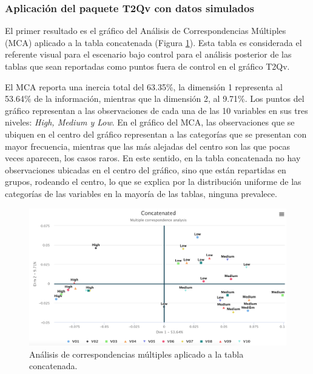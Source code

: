 \documentclass[mathematics,article,submit,moreauthors,pdftex]{mdpi}
\begin{document}
\hypertarget{aplicaciuxf3n-del-paquete-t2qv-con-datos-simulados}{%
\subsubsection{Aplicación del paquete T2Qv con datos
simulados}\label{aplicaciuxf3n-del-paquete-t2qv-con-datos-simulados}}

El primer resultado es el gráfico del Análisis de Correspondencias
Múltiples (MCA) aplicado a la tabla concatenada (Figura
\ref{fig:concatenatedfig}). Esta tabla es considerada el referente
visual para el escenario bajo control para el análisis posterior de las
tablas que sean reportadas como puntos fuera de control en el gráfico
T2Qv.

El MCA reporta una inercia total del 63.35\%, la dimensión 1 representa
al 53.64\% de la información, mientras que la dimensión 2, al 9.71\%.
Los puntos del gráfico representan a las observaciones de cada una de
las 10 variables en sus tres niveles: \emph{High, Medium y Low}. En el
gráfico del MCA, las observaciones que se ubiquen en el centro del
gráfico representan a las categorías que se presentan con mayor
frecuencia, mientras que las más alejadas del centro son las que pocas
veces aparecen, los casos raros. En este sentido, en la tabla
concatenada no hay observaciones ubicadas en el centro del gráfico, sino
que están repartidas en grupos, rodeando el centro, lo que se explica
por la distribución uniforme de las categorías de las variables en la
mayoría de las tablas, ninguna prevalece.

\begin{figure}[H]


\begin{center}\includegraphics[width=0.9\linewidth,]{concatenated} \end{center}

\caption{Análisis de correspondencias múltiples aplicado a la tabla concatenada.}

\label{fig:concatenatedfig}
\end{figure}
\end{document}
